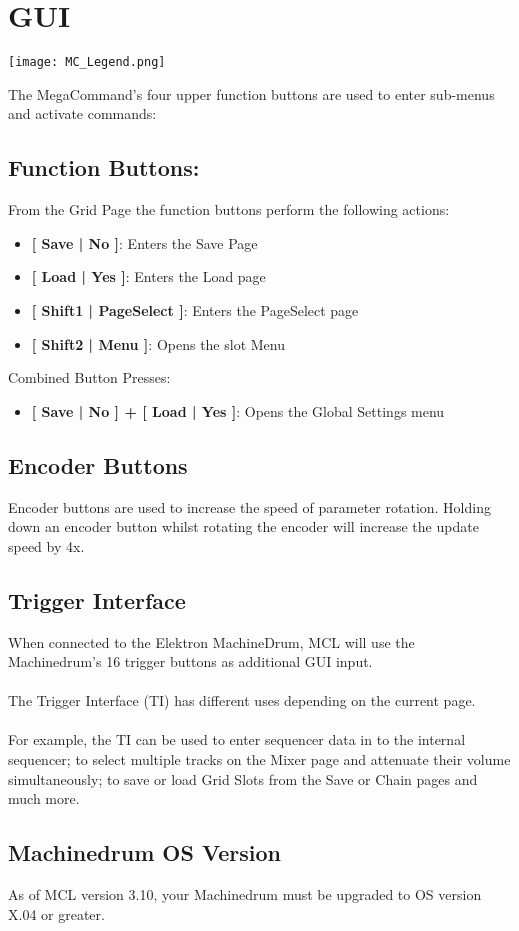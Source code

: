 \chapter{GUI}

\begin{center}
  \texttt{[image: MC\_Legend.png]}
\end{center}

The MegaCommand's four upper function buttons are used to enter sub-menus and activate commands:
\section{Function Buttons:}
From the Grid Page the function buttons perform the following actions:
\begin{itemize}
\item{\textbf{[ Save | No ]}: Enters the Save Page}
\item{\textbf{[ Load | Yes ]}: Enters the Load page}
\item{\textbf{[ Shift1 | PageSelect ]}: Enters the PageSelect page}
\item{\textbf{[ Shift2 | Menu ]}: Opens the slot Menu }
\end{itemize}
Combined Button Presses:
\begin{itemize}
\item{\textbf{[ Save | No ] + [ Load | Yes ]}: Opens the Global Settings menu }
\end{itemize}

\section{Encoder Buttons}
Encoder buttons are used to increase the speed of parameter rotation.
Holding down an encoder button whilst rotating the encoder will increase the update speed by 4x.

\section{Trigger Interface}
When connected to the Elektron MachineDrum, MCL will use the Machinedrum's 16 trigger buttons as additional GUI input. \\
\\
The Trigger Interface (TI) has different uses depending on the current page.\\
\\For example, the TI can be used to enter sequencer data in to the internal sequencer;
to select multiple tracks on the Mixer page and attenuate their volume simultaneously; to save or load Grid Slots from the Save or Chain pages and much more.

\section{Machinedrum OS Version}
As of MCL version 3.10, your Machinedrum must be upgraded to OS version X.04 or greater.

